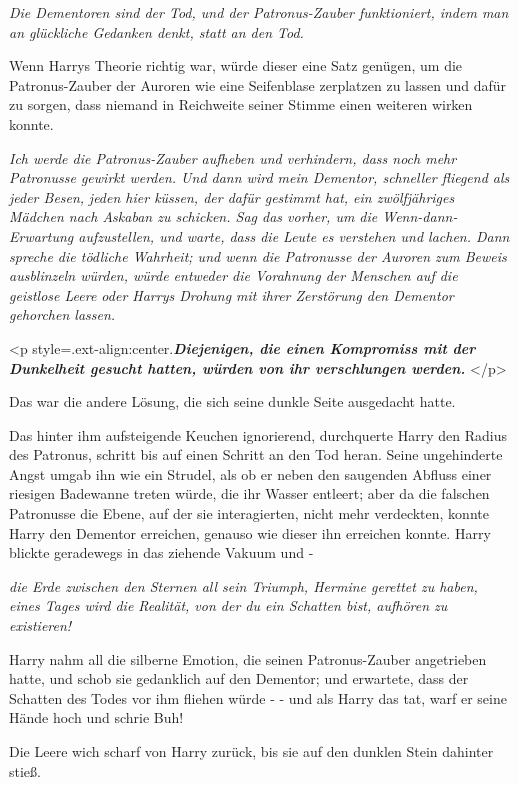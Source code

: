 \emph{Die Dementoren sind der Tod, und der Patronus-Zauber funktioniert, indem
man an glückliche Gedanken denkt, statt an den Tod.}

Wenn Harrys Theorie richtig war, würde dieser eine Satz genügen, um die
Patronus-Zauber der Auroren wie eine Seifenblase zerplatzen zu lassen und dafür
zu sorgen, dass niemand in Reichweite seiner Stimme einen weiteren wirken
konnte.

\emph{Ich werde die Patronus-Zauber aufheben und verhindern, dass noch mehr
Patronusse gewirkt werden. Und dann wird mein Dementor, schneller fliegend als
jeder Besen, }\emph{jeden hier küssen, der dafür gestimmt hat, ein zwölfjähriges
Mädchen nach Askaban zu schicken. Sag das vorher, um die Wenn-dann-Erwartung
aufzustellen, und warte, dass die Leute es verstehen und lachen. Dann spreche
die tödliche Wahrheit; und wenn die Patronusse der Auroren zum Beweis
ausblinzeln würden, würde entweder die Vorahnung der Menschen auf die geistlose
Leere oder Harrys Drohung mit ihrer Zerstörung den Dementor gehorchen lassen.}

<p style=\grqq{}.ext-align:center\grqq{}.\textbf{\emph{Diejenigen, die einen
Kompromiss mit der Dunkelheit gesucht hatten, würden von ihr verschlungen
werden. }}</p>

Das war die andere Lösung, die sich seine dunkle Seite ausgedacht hatte.

Das hinter ihm aufsteigende Keuchen ignorierend, durchquerte Harry den Radius
des Patronus, schritt bis auf einen Schritt an den Tod heran. Seine ungehinderte
Angst umgab ihn wie ein Strudel, als ob er neben den saugenden Abfluss einer
riesigen Badewanne treten würde, die ihr Wasser entleert; aber da die falschen
Patronusse die Ebene, auf der sie interagierten, nicht mehr verdeckten, konnte
Harry den Dementor erreichen, genauso wie dieser ihn erreichen konnte. Harry
blickte geradewegs in das ziehende Vakuum und -

\emph{die Erde zwischen den Sternen all sein Triumph, Hermine gerettet zu haben,
eines Tages wird die Realität, von der du ein Schatten bist, aufhören zu
existieren!}

Harry nahm all die silberne Emotion, die seinen Patronus-Zauber angetrieben
hatte, und schob sie gedanklich auf den Dementor; und erwartete, dass der
Schatten des Todes vor ihm fliehen würde - - und als Harry das tat, warf er
seine Hände hoch und schrie \glqq Buh!\grqq{}

Die Leere wich scharf von Harry zurück, bis sie auf den dunklen Stein dahinter
stieß.

